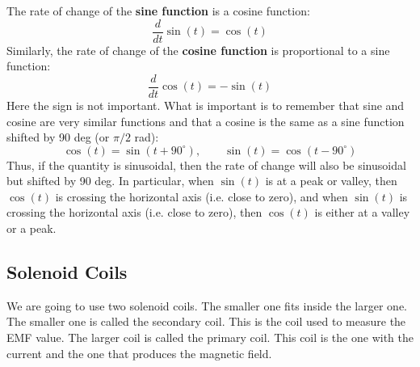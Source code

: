 The rate of change of the \textbf{sine function} is a cosine function:
\begin{equation}
	\frac{d}{dt} \sin{(t)} = \cos{(t)}
\end{equation}
Similarly, the rate of change of the \textbf{cosine function} is proportional to a sine function:
\begin{equation}
	\frac{d}{dt} \cos{(t)} = -\sin{(t)}
\end{equation}
Here the sign is not important. What is important is to remember that sine and cosine are very similar functions and that a cosine is the same as a sine function shifted by 90 deg (or $\pi/2$ rad):
\begin{equation}
	\cos{(t)} = \sin{(t + 90^{\circ})}, \qquad \sin{(t)} = \cos{(t - 90^{\circ})}
\end{equation}
Thus, if the quantity is sinusoidal, then the rate of change will also be sinusoidal but shifted by 90 deg. In particular, when $\sin{(t)}$ is at a peak or valley, then $\cos{(t)}$ is crossing the horizontal axis (i.e. close to zero), and when $\sin{(t)}$ is crossing the horizontal axis (i.e. close to zero), then $\cos{(t)}$ is either at a valley or a peak.
\subsection{Solenoid Coils}
We are going to use two solenoid coils. The smaller one fits inside the larger one. The smaller one is called the secondary coil. This is the coil used to measure the EMF value. The larger coil is called the primary coil. This coil is the one with the current and the one that produces the magnetic field.

